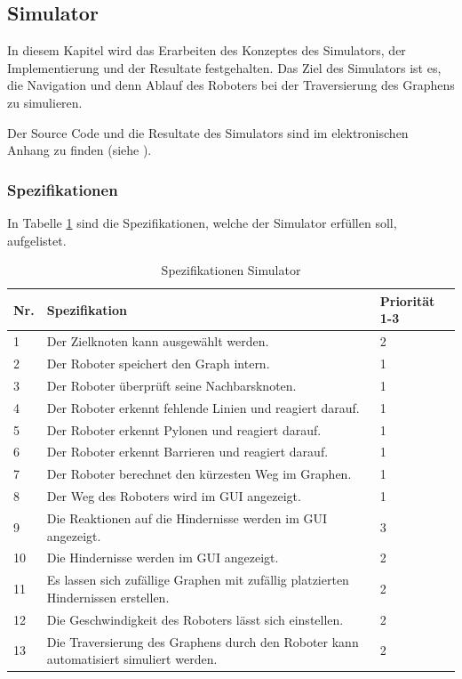 \subsection{Simulator}

In diesem Kapitel wird das Erarbeiten des Konzeptes des Simulators, der Implementierung und der Resultate festgehalten. Das Ziel des Simulators ist es, die Navigation und denn Ablauf des Roboters bei der Traversierung des Graphens zu simulieren.

Der Source Code und die Resultate des Simulators sind im elektronischen Anhang zu finden (siehe ).

\subsubsection{Spezifikationen}

In Tabelle \ref{table:spezifikation-simulator} sind die Spezifikationen, welche der Simulator erfüllen soll, aufgelistet.

\begin{table}[H]
\centering
\small
\begin{tabularx}{\textwidth}{|l|X|l|}
\hline
  \textbf{Nr.} & \textbf{Spezifikation} & \textbf{Priorität 1-3}  \\
  \hline
  1  & Der Zielknoten kann ausgewählt werden. &  2\\
  \hline
   2   & Der Roboter speichert den Graph intern.  & 1\\
  \hline
   3 & Der Roboter überprüft seine Nachbarsknoten.&1\\
  \hline
  4 & Der Roboter erkennt fehlende Linien und reagiert darauf. & 1\\
  \hline
  5 &   Der Roboter erkennt Pylonen und reagiert darauf. & 1\\
  \hline
   6  &   Der Roboter erkennt Barrieren und reagiert darauf. & 1\\
  \hline
    7 &   Der Roboter berechnet den kürzesten Weg im Graphen.& 1\\
  \hline
     8  &   Der Weg des Roboters wird im GUI angezeigt. & 1\\
  \hline
      9   &   Die Reaktionen auf die Hindernisse werden im GUI angezeigt. & 3\\
  \hline
 10   &   Die Hindernisse werden im GUI angezeigt. & 2\\
  \hline
   11   &   Es lassen sich zufällige Graphen mit zufällig platzierten Hindernissen erstellen. & 2\\
  \hline
   12   &   Die Geschwindigkeit des Roboters lässt sich einstellen. & 2\\
  \hline
   13   &   Die Traversierung des Graphens durch den Roboter kann automatisiert simuliert werden. & 2\\
  \hline

\end{tabularx}
\caption{Spezifikationen Simulator}
\label{table:spezifikation-simulator}
\end{table}

